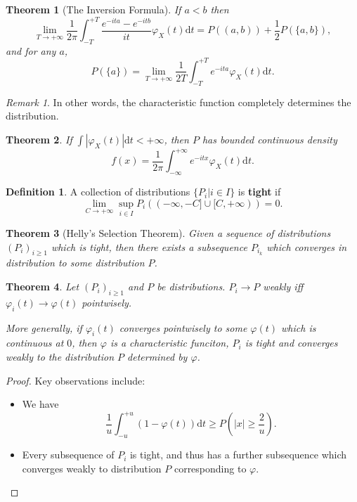 \documentclass[openany]{book}
\newtheorem{theorem}{Theorem}[chapter]
\theoremstyle{definition}
\newtheorem{definition}{Definition}[chapter]
\theoremstyle{remark}
\newtheorem*{remark}{Remark}
\begin{document}
\begin{theorem}[The Inversion Formula]
    If $a<b$ then
    \begin{equation*}
        \lim_{T\to+\infty}\frac{1}{2\pi}\int_{-T}^{+T}\frac{e^{-ita}-e^{-itb}}{it}\varphi_X(t)\mathrm{d}t=P\left((a,b)\right)+\frac{1}{2}P\left(\{a,b\}\right),
    \end{equation*}
    and for any $a$,
    \begin{equation*}
        P\left(\{a\}\right)=\lim_{T\to+\infty}\frac{1}{2T}\int_{-T}^{+T}e^{-ita}\varphi_X(t)\mathrm{d}t.
    \end{equation*}
\end{theorem}
\begin{remark}
    In other words, the characteristic function completely determines the distribution.
\end{remark}
\begin{theorem}
    If $\int|\varphi_X(t)|\mathrm{d}t<+\infty$, then $P$ has bounded continuous density
    \begin{equation*}
        f(x)=\frac{1}{2\pi}\int_{-\infty}^{+\infty}e^{-itx}\varphi_X(t)\mathrm{d}t.
    \end{equation*}
\end{theorem}

\begin{definition}
    A collection of distributions $\{P_i|i\in I\}$ is \textbf{tight} if
    \begin{equation*}
        \lim_{C\to+\infty}\sup_{i\in I}P_i\left((-\infty,-C]\cup[C,+\infty)\right)=0.
    \end{equation*}
\end{definition}
\begin{theorem}[Helly's Selection Theorem]
    Given a sequence of distributions $(P_i)_{i\ge1}$ which is tight, then there exists a subsequence $P_{i_k}$ which converges in distribution to some distribution $P$.
\end{theorem}
\begin{theorem}
    Let $(P_i)_{i\ge1}$ and $P$ be distributions. $P_i\to P$ weakly iff $\varphi_i(t)\to\varphi(t)$ pointwisely.

    More generally, if $\varphi_i(t)$ converges pointwisely to some $\varphi(t)$ which is continuous at $0$, then $\varphi$ is a characteristic funciton, $P_i$ is tight and converges weakly to the distribution $P$ determined by $\varphi$.
\end{theorem}
\begin{proof}
    Key observations include:
    \begin{itemize}
        \item We have
        \begin{equation*}
            \frac{1}{u}\int_{-u}^{+u}\left(1-\varphi(t)\right)\mathrm{d}t\ge P\left(|x|\ge \frac{2}{u}\right).
        \end{equation*}

        \item Every subsequence of $P_i$ is tight, and thus has a further subsequence which converges weakly to distribution $P$ corresponding to $\varphi$.
    \end{itemize}
\end{proof}
\end{document}
